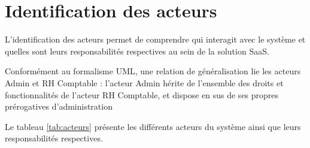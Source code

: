 \section{Identification des acteurs}\label{sec:acteurs}
L'identification des acteurs permet de comprendre qui interagit avec le système et quelles sont leurs responsabilités respectives au sein de la solution SaaS.

Conformément au formalisme UML, une relation de généralisation lie les acteurs Admin et RH Comptable : l'acteur
Admin hérite de l'ensemble des droits et fonctionnalités de l'acteur RH Comptable, et dispose en sus de ses propres
prérogatives d'administration

Le tableau \ref{tab:acteurs} présente les différents acteurs du système ainsi que leurs responsabilités respectives.
\renewcommand{\arraystretch}{2.2}

